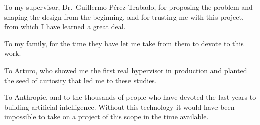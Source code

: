 \begin{umaacknowledgments}
To my supervisor, Dr.~Guillermo Pérez Trabado, for proposing the
problem and shaping the design from the beginning, and for trusting
me with this project, from which I have learned a great deal.

To my family, for the time they have let me take from them to
devote to this work.

To Arturo, who showed me the first real hypervisor in production
and planted the seed of curiosity that led me to these studies.

To Anthropic, and to the thousands of people who have devoted the
last years to building artificial intelligence. Without this
technology it would have been impossible to take on a project of
this scope in the time available.
\end{umaacknowledgments}
